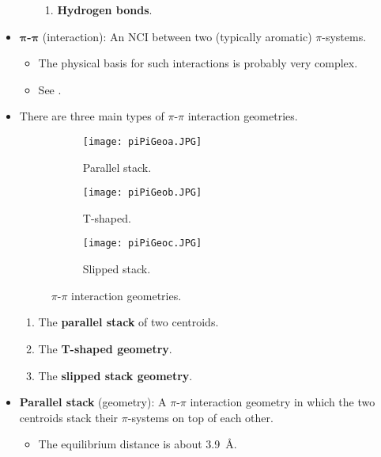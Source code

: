 \documentclass[../notes.tex]{subfiles}
\begin{document}
\begin{itemize}
\begin{itemize}
\begin{enumerate}[label={\Roman*.)}]
            \item \textbf{Hydrogen bonds}.
        \end{enumerate}
    \end{itemize}
    \item \textbf{$\bm{\pi}$-$\bm{\pi}$} (interaction): An NCI between two (typically aromatic) $\pi$-systems.
    \begin{itemize}
        \item The physical basis for such interactions is probably very complex.
        \item See \textcite[184]{bib:Anslyn}.
    \end{itemize}
    \item There are three main types of $\pi$-$\pi$ interaction geometries.
    \begin{figure}[h!]
        \centering
        \begin{subfigure}[b]{0.25\linewidth}
            \centering
            \texttt{[image: piPiGeoa.JPG]}
            \caption{Parallel stack.}
            \label{fig:piPiGeoa}
        \end{subfigure}
        \begin{subfigure}[b]{0.25\linewidth}
            \centering
            \texttt{[image: piPiGeob.JPG]}
            \caption{T-shaped.}
            \label{fig:piPiGeob}
        \end{subfigure}
        \begin{subfigure}[b]{0.25\linewidth}
            \centering
            \texttt{[image: piPiGeoc.JPG]}
            \caption{Slipped stack.}
            \label{fig:piPiGeoc}
        \end{subfigure}
        \caption{$\pi$-$\pi$ interaction geometries.}
        \label{fig:piPiGeo}
    \end{figure}
    \begin{enumerate}
        \item The \textbf{parallel stack} of two centroids.
        \item The \textbf{T-shaped geometry}.
        \item The \textbf{slipped stack geometry}.
    \end{enumerate}
    \item \textbf{Parallel stack} (geometry): A $\pi$-$\pi$ interaction geometry in which the two centroids stack their $\pi$-systems on top of each other.
    \begin{itemize}
        \item The equilibrium distance is about \SI{3.9}{\angstrom}.

\end{itemize}
\end{itemize}
\end{document}
